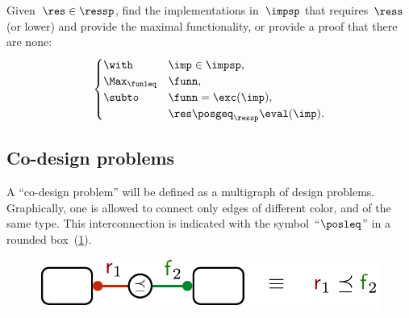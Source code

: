 \begin{problem}[FixResMinFun]
    Given~$\res\in\ressp$, find the implementations
in~$\impsp$ that requires~$\ress$ (or lower)
and provide the maximal functionality,  or provide a proof that there are none:
\begin{equation}
\begin{cases}
\with & \imp\in\impsp,\\
\Max_{\funleq} & \funn,\\
\subto & \funn=\exc(\imp),\\
 & \res\posgeq_{\ressp}\eval(\imp).
\end{cases}\label{eq:objective-1}
\end{equation}
\end{problem}





\subsection{Co-design problems\label{sec:Co-design-problems}}

A ``co-design problem'' will be defined as a multigraph of design
problems. Graphically, one is allowed to connect only edges of different
color, and of the same type. This interconnection is indicated with the symbol~``$\posleq$''
in a rounded box~(\cref{fig:connection}). 

\begin{figure}[h]
    \centering
    \includegraphics[scale=0.33]{papers/uncertainty/unc_connection.pdf}
    \caption{\label{fig:connection}}
\end{figure}


